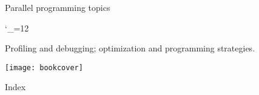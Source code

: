 \documentclass[11pt,headernav]{beamer}
\begin{document}


 {Parallel programming topics}

\begingroup \catcode`\_=12
\let\indexmpishow\texttt

\endgroup

 {Profiling and debugging; optimization and programming strategies.}




\begin{frame}
  \texttt{[image: bookcover]}
\end{frame}

\newenvironment{theindex}{\begin{itemize}}{\end{itemize}}
\let\indexspace\par
\def\subitem{\par\indent}

\begin{frame}{Index}
\small
\begin{multicols}{2}
\printindex  
\end{multicols}
\end{frame}
\end{document}
